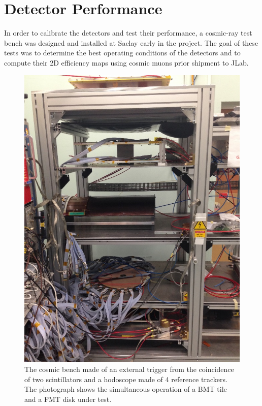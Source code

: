 \section{Detector Performance}

In order to calibrate the detectors and test their performance, a cosmic-ray test bench was designed and installed at Saclay
early in the project. The goal of these tests was to determine the best operating conditions
of the detectors and to compute their 2D efficiency maps using cosmic muons prior shipment to JLab.

\begin{figure}[htb]
 \includegraphics[width=1.0\columnwidth,keepaspectratio]{images/banc_cosmique}
 \caption{The cosmic bench made of an external trigger from the coincidence of two scintillators and a hodoscope made of 4 
reference trackers. The photograph shows the simultaneous operation of a BMT tile and a FMT disk under test.}
 \label{fig:mm-testbench}
\end{figure}

